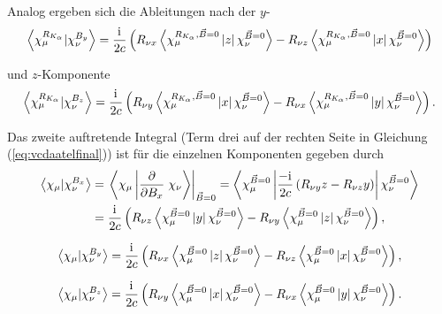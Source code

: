 	Analog ergeben sich die Ableitungen nach der $y$-
	\begin{equation} \label{eq:ddipy}
	\left\langle\chi_\mu^{R_{K_\alpha}}\vert\chi_\nu^{B_y}\right\rangle=\frac{\mathrm{i}\mkern1mu}{2c}\left(R_{\nu x}\left\langle\chi_\mu^{R_{K_\alpha},\vec{B}=0}\left|z\right|\chi_\nu^{\vec{B}=0}\right\rangle-R_{\nu z}\left\langle\chi_\mu^{R_{K_\alpha},\vec{B}=0}\left|x\right|\chi_\nu^{\vec{B}=0}\right\rangle\right)
	\end{equation}
	
	und $z$-Komponente	
	\begin{equation} \label{eq:ddipz}
	\left\langle\chi_\mu^{R_{K_\alpha}}\vert\chi_\nu^{B_z}\right\rangle=\frac{\mathrm{i}\mkern1mu}{2c}\left(R_{\nu y}\left\langle\chi_\mu^{R_{K_\alpha},\vec{B}=0}\left|x\right|\chi_\nu^{\vec{B}=0}\right\rangle-R_{\nu x}\left\langle\chi_\mu^{R_{K_\alpha},\vec{B}=0}\left|y\right|\chi_\nu^{\vec{B}=0}\right\rangle\right).
	\end{equation}
	
	Das zweite auftretende Integral (Term drei auf der rechten Seite in Gleichung (\ref{eq:vcdaatelfinal})) ist für die einzelnen Komponenten gegeben durch	
	\begin{equation} \label{eq:dipx}
	\begin{aligned}
	  \left\langle\chi_\mu\vert\chi_\nu^{B_x}\right\rangle&=\left.\left\langle\chi_\mu\left|\frac{\partial}{\partial B_x}\right.\chi_\nu\right\rangle\right|_{\vec{B}=0}=\left\langle\chi_\mu^{\vec{B}=0}\left|\frac{-\mathrm{i}\mkern1mu}{2c}\left(R_{\nu y}z-R_{\nu z}y\right)\right|\chi_\nu^{\vec{B}=0}\right\rangle\\
	  &=\frac{\mathrm{i}\mkern1mu}{2c}\left(R_{\nu z}\left\langle\chi_\mu^{\vec{B}=0}\left|y\right|\chi_\nu^{\vec{B}=0}\right\rangle-R_{\nu y}\left\langle\chi_\mu^{\vec{B}=0}\left|z\right|\chi_\nu^{\vec{B}=0}\right\rangle\right),
	\end{aligned}
	\end{equation}
 
		\begin{equation} \label{eq:dipy}
	  \left\langle\chi_\mu\vert\chi_\nu^{B_y}\right\rangle=\frac{\mathrm{i}\mkern1mu}{2c}\left(R_{\nu x}\left\langle\chi_\mu^{\vec{B}=0}\left|z\right|\chi_\nu^{\vec{B}=0}\right\rangle-R_{\nu z}\left\langle\chi_\mu^{\vec{B}=0}\left|x\right|\chi_\nu^{\vec{B}=0}\right\rangle\right),
	\end{equation}
	
		\begin{equation} \label{eq:dipz}
	  \left\langle\chi_\mu\vert\chi_\nu^{B_z}\right\rangle=\frac{\mathrm{i}\mkern1mu}{2c}\left(R_{\nu y}\left\langle\chi_\mu^{\vec{B}=0}\left|x\right|\chi_\nu^{\vec{B}=0}\right\rangle-R_{\nu x}\left\langle\chi_\mu^{\vec{B}=0}\left|y\right|\chi_\nu^{\vec{B}=0}\right\rangle\right).
	\end{equation}

